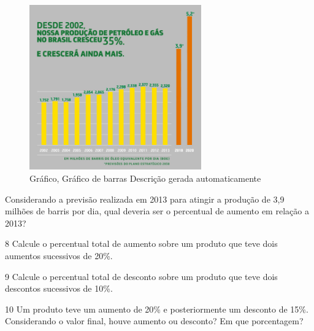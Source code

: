 \begin{escolha}
{{\begin{figure}
\centering
\includegraphics[width=2.91782in,height=2.79636in]{./_SAEB_9_MAT/media/image64.jpg}
\caption{Gráfico, Gráfico de barras Descrição gerada automaticamente}
\end{figure}


Considerando a previsão realizada em 2013 para atingir a produção de 3,9
milhões de barris por dia, qual deveria ser o percentual de aumento em
relação a 2013?


\num{8} Calcule o percentual total de aumento sobre um produto que teve
dois aumentos sucessivos de 20\%.


\num{9} Calcule o percentual total de desconto sobre um produto que teve
dois descontos sucessivos de 10\%.


\num{10} Um produto teve um aumento de 20\% e posteriormente um desconto
de 15\%. Considerando o valor final, houve aumento ou desconto? Em que 
porcentagem?


}}
\end{escolha}
